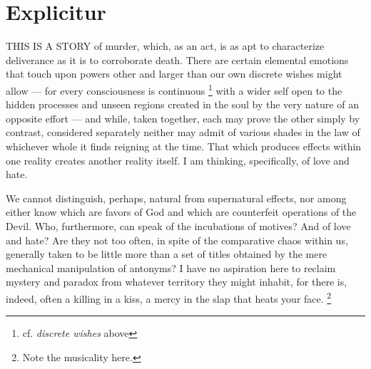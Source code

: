 \chapter*{Explicitur}
%

THIS IS A STORY of murder, which, as an act, is as apt 
to characterize deliverance 
as it is to corroborate 
death. There are certain elemental emotions
that touch upon powers other and larger than our own discrete wishes might
allow --- for every consciousness is continuous 
\footnote{cf. \textit{discrete wishes} above}
with a wider self open to the hidden
processes and unseen regions created in the soul by the very nature of an
opposite effort --- and while, taken together, each may prove the other simply by
contrast, considered separately neither may admit of various shades in the law
of whichever whole it finds reigning at the time. That which produces effects
within one reality creates another reality itself. I am thinking, specifically,
of love and hate.

  We cannot distinguish, perhaps, natural from supernatural effects, nor among
either know which are favors of God and which are counterfeit operations of the
Devil. Who, furthermore, can speak of the incubations
of motives? And of love
and hate? Are they not too often, in spite of the comparative chaos within us,
generally taken to be little more than a set of titles obtained by the mere
mechanical manipulation of antonyms? I have no aspiration
here to reclaim
mystery and paradox from whatever territory they might inhabit, for there is,
indeed, often a killing in a kiss, a mercy in the slap that heats your face.
\footnote{Note the musicality here.}

